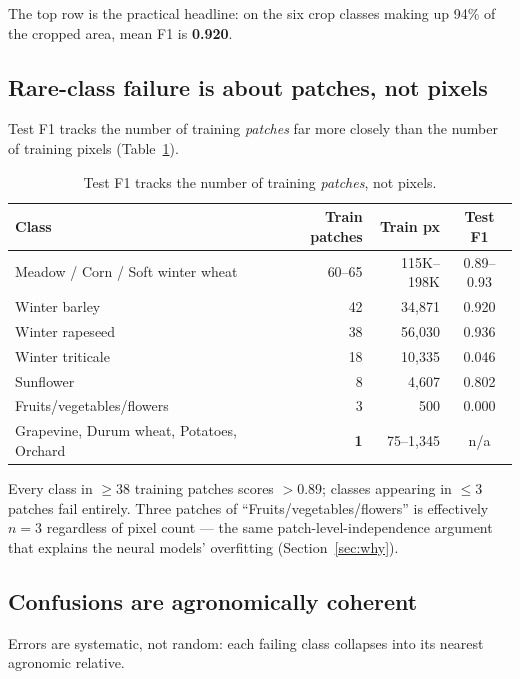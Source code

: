 \documentclass[11pt,a4paper]{article}
\begin{document}
The top row is the practical headline: on the six crop classes making up 94\%
of the cropped area, mean F1 is \textbf{0.920}.

\subsection{Rare-class failure is about patches, not pixels}

Test F1 tracks the number of training \emph{patches} far more closely than the
number of training pixels (Table~\ref{tab:patches}).

\begin{table}[htbp]
\centering
\caption{Test F1 tracks the number of training \emph{patches}, not pixels.}
\label{tab:patches}
\begin{tabular}{lrrc}
\toprule
\textbf{Class} & \textbf{Train patches} & \textbf{Train px} & \textbf{Test F1} \\
\midrule
Meadow / Corn / Soft winter wheat  & 60--65 & 115K--198K & 0.89--0.93 \\
Winter barley                      & 42     & 34{,}871   & 0.920 \\
Winter rapeseed                    & 38     & 56{,}030   & 0.936 \\
Winter triticale                   & 18     & 10{,}335   & 0.046 \\
Sunflower                          & 8      & 4{,}607    & 0.802 \\
Fruits/vegetables/flowers          & 3      & 500        & 0.000 \\
Grapevine, Durum wheat, Potatoes, Orchard & \textbf{1} & 75--1{,}345 & n/a \\
\bottomrule
\end{tabular}
\end{table}

Every class in $\geq$38 training patches scores $>$0.89; classes appearing in
$\leq$3 patches fail entirely. Three patches of ``Fruits/vegetables/flowers'' is
effectively $n = 3$ regardless of pixel count --- the same
patch-level-independence argument that explains the neural models' overfitting
(Section~\ref{sec:why}).

\subsection{Confusions are agronomically coherent}

Errors are systematic, not random: each failing class collapses into its nearest
agronomic relative.
\end{document}
